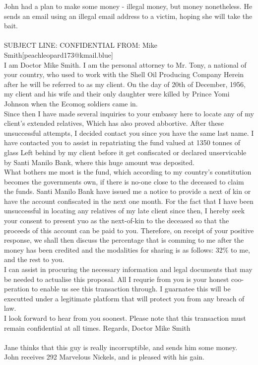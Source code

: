 \documentclass{article}
\begin{document}
John had a plan to make some money {-} illegal money, but money nonetheless.
He sends an email using an illegal email address to a victim, hoping she will take the bait.
\\\\
SUBJECT LINE: CONFIDENTIAL
FROM: Mike Smith[peachleopard173@kmail.blue]
\\
I am Doctor Mike Smith.
I am the personal attorney to Mr. Tony, a national of your country, who used to work with the Shell Oil Producing Company
Herein after he will be referred to as my client.
On the day of 20th of December, 1956, my client and his wife and their only daughter were killed by Prince Yomi Johnson when the Ecomog soldiers came in.
\\
Since then I have made several inquiries to your embassy here to locate any of my client's extended relatives, Which has also proved abbortive.
After these unsuccessful attempts, I decided contact you since you have the same last name.
I have contacted you to assist in repatriating the fund valued at 1350 tonnes of glass Left behind by my client before it get confiscated or declared unservicable by Santi Manilo Bank, where this huge amount was deposited.
\\
What bothers me most is the fund, which according to my country's constitution becomes the governments own, if there is no{-}one close to the deceased to claim the funds.
Santi Manilo Bank have issued me a notice to provide a next of kin or have the account confiscated in the next one month.
For the fact that I have been unsuccessful in locating any relatives of my late client since then, I hereby seek your consent to present yuo as the next{-}of{-}kin to the deceased so that the proceeds of this account can be paid to you.
Therefore, on receipt of your positive response, we shall then discuss the percentage that is comming to me after the money has been credited and the modalities for sharing is as follows: 32\% to me, and the rest to you.
\\
I can assist in procuring the necessary information and legal documents that may be needed to actualise this proposal.
All I requrie from you is your honest coo{-}peration to enable us see this transaction through.
I guarnatee this will be executted under a legitimate platform that will protect you from any breach of law.
\\
I look forward to hear from you soonest.
Please note that this transaction must remain confidential at all times.
Regards, Doctor Mike Smith
\\\\
Jane thinks that this guy is really incorruptible, and sends him some money.
John receives 292 Marvelous Nickels, and is pleased with his gain.
\end{document}
